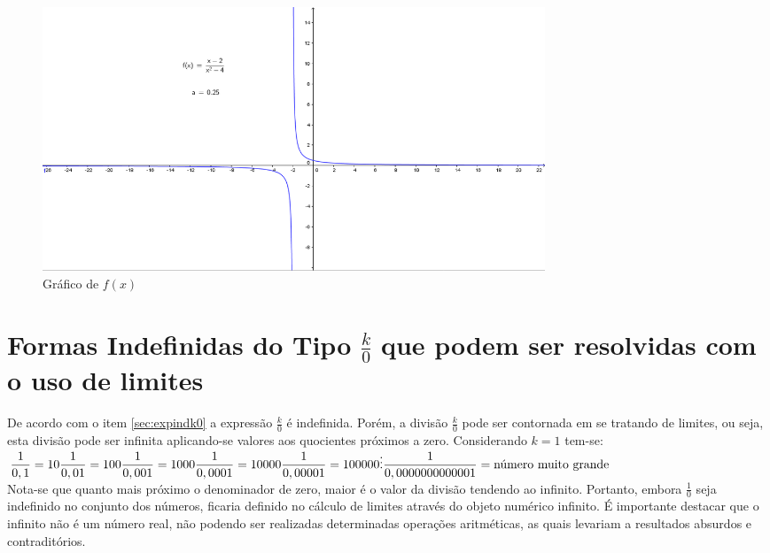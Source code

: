 \begin{figure}[H]
\centering %
\includegraphics[width=15cm]{img/sub5.png} %
\caption{Gráfico de $f(x)$}
\label{fig:graph3}
\end{figure}


\section{Formas Indefinidas do Tipo $\displaystyle \frac{k}{0}$ que podem ser resolvidas com o uso de limites}

De acordo com o  item \ref{sec:expindk0}  a expressão $\displaystyle \frac{k}{0}$ é indefinida. Porém, a divisão $\displaystyle \frac{k}{0}$  pode ser contornada em se tratando de limites, ou seja, esta divisão pode ser infinita aplicando-se valores aos quocientes próximos a zero. Considerando  $k=1$ tem-se:\\
$
\displaystyle \frac{1}{0,1} = 10   \\
\displaystyle \frac{1}{0,01} = 100 \\ 
\displaystyle \frac{1}{0,001} =1000  \\
\displaystyle \frac{1}{0,0001} =10000  \\
\displaystyle \frac{1}{0,00001} = 100000 \\
\vdots \\
\displaystyle \frac{1}{0,0000000000001} = \textrm{número muito grande}   
$\\



Nota-se que quanto mais próximo o denominador de zero, maior é o valor da divisão tendendo ao infinito. Portanto, embora  $\displaystyle \frac{1}{0}$  seja indefinido no conjunto dos números, ficaria definido no cálculo de limites através do objeto numérico infinito. É importante destacar que o infinito não é um número real, não podendo ser realizadas determinadas operações aritméticas, as quais levariam a resultados absurdos e contraditórios.

